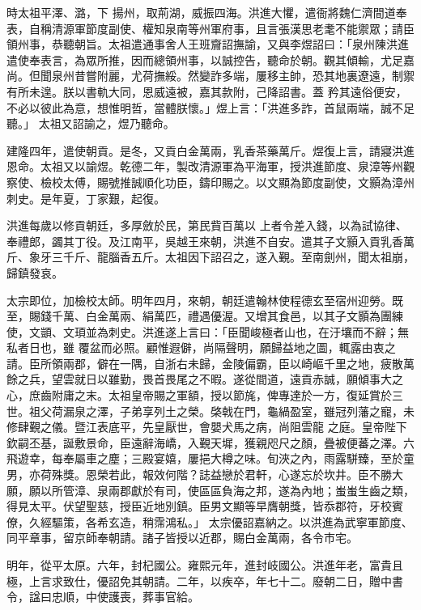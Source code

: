 \begin{pinyinscope}
 時太祖平澤、潞，下
 揚州，取荊湖，威振四海。洪進大懼，遣衙將魏仁濟間道奉表，自稱清源軍節度副使、權知泉南等州軍府事，且言張漢思老耄不能禦眾；請臣領州事，恭聽朝旨。太祖遣通事舍人王班齎詔撫諭，又與李煜詔曰：「泉州陳洪進遣使奉表言，為眾所推，因而總領州事，以誠控告，聽命於朝。觀其傾輸，尤足嘉尚。但聞泉州昔嘗附麗，尤荷撫綏。然變詐多端，屢移主帥，恐其地裏遼遠，制禦有所未遑。朕以書軌大同，恩威遠被，嘉其款附，己降詔書。蓋
 矜其遠俗便安，不必以彼此為意，想惟明哲，當體朕懷。」煜上言：「洪進多詐，首鼠兩端，誠不足聽。」 太祖又詔諭之，煜乃聽命。



 建隆四年，遣使朝貢。是冬，又貢白金萬兩，乳香茶藥萬斤。煜復上言，請寢洪進恩命。太祖又以諭煜。乾德二年，製改清源軍為平海軍，授洪進節度、泉漳等州觀察使、檢校太傅，賜號推誠順化功臣，鑄印賜之。以文顯為節度副使，文顥為漳州刺史。是年夏，丁家艱，起復。



 洪進每歲以修貢朝廷，多厚斂於民，第民貲百萬以
 上者令差入錢，以為試協律、奉禮郎，蠲其丁役。及江南平，吳越王來朝，洪進不自安。遣其子文顥入貢乳香萬斤、象牙三千斤、龍腦香五斤。太祖因下詔召之，遂入覲。至南劍州，聞太祖崩，歸鎮發哀。



 太宗即位，加檢校太師。明年四月，來朝，朝廷遣翰林使程德玄至宿州迎勞。既至，賜錢千萬、白金萬兩、絹萬匹，禮遇優渥。又增其食邑，以其子文顥為團練使，文顗、文頊並為刺史。洪進遂上言曰：「臣聞峻極者山也，在汙壤而不辭；無私者日也，雖
 覆盆而必照。顧惟遐僻，尚隔聲明，願歸益地之圖，輒露由衷之請。臣所領兩郡，僻在一隅，自浙右未歸，金陵偏霸，臣以崎嶇千里之地，疲散萬餘之兵，望雲就日以雖勤，畏首畏尾之不暇。遂從間道，遠貢赤誠，願傾事大之心，庶齒附庸之末。太祖皇帝賜之軍額，授以節旄，俾專達於一方，復延賞於三世。祖父荷漏泉之澤，子弟享列土之榮。棨戟在門，龜緺盈室，雖冠列藩之寵，未修肆覲之儀。暨江表底平，先皇厭世，會嬰犬馬之病，尚阻雲龍
 之庭。皇帝陛下欽嗣丕基，誕敷景命，臣遠辭海嶠，入覲天墀，獲親咫尺之顏，疊被便蕃之澤。六飛遊幸，每奉屬車之塵；三殿宴嬉，屢挹大樽之味。旬浹之內，雨露駢臻，至於童男，亦荷殊獎。恩榮若此，報效何階？誌益戀於君軒，心遂忘於坎井。臣不勝大願，願以所管漳、泉兩郡獻於有司，使區區負海之邦，遂為內地；蚩蚩生齒之類，得見太平。伏望聖慈，授臣近地別鎮。臣男文顯等早膺朝獎，皆忝郡符，牙校賓僚，久經驅策，各希玄造，稍霈鴻私。」
 太宗優詔嘉納之。以洪進為武寧軍節度、同平章事，留京師奉朝請。諸子皆授以近郡，賜白金萬兩，各令市宅。



 明年，從平太原。六年，封杞國公。雍熙元年，進封岐國公。洪進年老，富貴且極，上言求致仕，優詔免其朝請。二年，以疾卒，年七十二。廢朝二日，贈中書令，諡曰忠順，中使護喪，葬事官給。




\end{pinyinscope}

